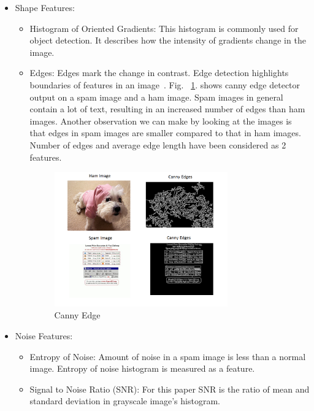 \begin{itemize}
	\item Shape Features:
	\begin{itemize}	
		\item Histogram of Oriented Gradients: This histogram is commonly used for object detection. It describes how the intensity of gradients change in the image. 
		\item Edges: Edges mark the change in contrast. Edge detection highlights boundaries of features in an image~\cite{6}. Fig. ~\ref{fig:cannyEdges}. shows canny edge detector output on a spam image and a ham image. Spam images in general contain a lot of text, resulting in an increased number of edges than ham images. Another observation we can make by looking at the images is that edges in spam images are smaller compared to that in ham images. Number of edges and average edge length have been considered as 2 features.
		\begin{figure}[h]
			\centering
			\includegraphics[width=0.75\textwidth]{images/cannyEdges.PNG}
			\caption{Canny Edge}
			\label{fig:cannyEdges}
		\end{figure}   
	\end{itemize}
	
	\item Noise Features:
	\begin{itemize}
		\item Entropy of Noise: Amount of noise in a spam image is less than a normal image. Entropy of noise histogram is measured as a feature.
		\item Signal to Noise Ratio (SNR): For this paper SNR is the ratio of mean and standard deviation in grayscale image's histogram.  	
	\end{itemize}
\end{itemize}


